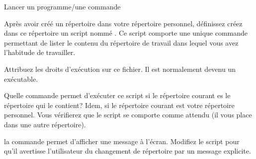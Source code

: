 \begin{exercice}
  \begin{exercicelet}{Lancer un programme/une commande}
    \begin{questions}
    \item Après avoir créé un répertoire  dans votre répertoire
      personnel, définissez créez dans ce répertoire un script nommé
      . Ce script comporte une unique commande permettant de
      lister le contenu du répertoire de travail
       dans lequel vous avez l'habitude de travailler.
    \item Attribuez les droits d'exécution sur ce fichier. Il est normalement
      devenu un exécutable.
    \item Quelle commande permet d'exécuter ce script si le répertoire courant
      es le répertoire  qui le contient? Idem, si le répertoire
      courant est votre répertoire personnel. Vous vérifierez que le script se
      comporte comme attendu (il vous place dans une autre répertoire).
    \item la commande  permet d'afficher une message à
      l'écran. Modifiez le script pour qu'il avertisse l'utilisateur du
      changement de répertoire par un message explicite.
    \end{questions}
  \end{exercicelet}
\end{exercice}


